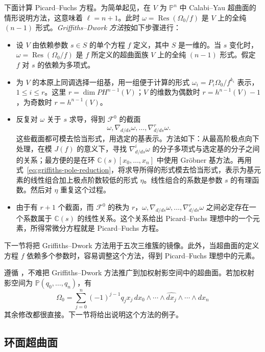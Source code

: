 下面计算 Picard--Fuchs 方程。为简单起见，在 $V$ 为 $\mathbb P^n$ 中 Calabi--Yau 超曲面的情形说明方法，这意味着 $\ell=n+1$。此时 $\omega=\operatorname{Res}(\Omega_0/f)$ 是 $V$ 上的全纯 $(n-1)$ 形式。\emph{Griffiths--Dwork 方法}按如下步骤进行：
\begin{itemize}
\item 设 $V$ 由依赖参数 $s\in S$ 的单个方程 $f$ 定义，其中 $S$ 是一维的。当 $s$ 变化时，$\omega=\operatorname{Res}(\Omega_0/f)$ 是 $f$ 所定义的超曲面族 $V$ 上的全纯 $(n-1)$ 形式。假定 $f$ 对 $s$ 的依赖为多项式。
\item 为 $V$ 的本原上同调选择一组基，用一组便于计算的形式 $\omega_i=P_i\Omega_0/f^{k_i}$ 表示，$1\leq i\leq r$。这里 $r=\dim PH^{n-1}(V)$；$V$ 的维数为偶数时 $r=h^{n-1}(V)-1$，为奇数时 $r=h^{n-1}(V)$。
\item 反复对 $\omega$ 关于 $s$ 求导，得到 $\mathcal F^0$ 的截面
\[
\omega,\nabla_{d/ds}\omega,\ldots,\nabla_{d/ds}^r\omega.
\]
这些截面都可模去恰当形式，用选定的基表示。方法如下：从最高阶极点向下处理，在模 $J(f)$ 的意义下，寻找 $\nabla_{d/ds}^i\omega$ 的分子多项式与选定基的分子之间的关系；最方便的是在环 $\mathbb C(s)[x_0,\ldots,x_n]$ 中使用 Gröbner 基方法。再用式~\eqref{eq:griffiths-pole-reduction}，将求导所得的形式模去恰当形式，表示为基元素的线性组合加上极点阶数较低的形式 $\eta$。线性组合的系数是参数 $s$ 的有理函数。然后对 $\eta$ 重复这个过程。
\item 由于有 $r+1$ 个截面，而 $\mathcal F^0$ 的秩为 $r$，$\omega,\nabla_{d/ds}\omega,\ldots,\nabla_{d/ds}^r\omega$ 之间必定存在一个系数属于 $\mathbb C(s)$ 的线性关系。这个关系给出 Picard--Fuchs 理想中的一个元素，所得常微分方程就是 Picard--Fuchs 方程。
\end{itemize}
下一节将把 Griffiths--Dwork 方法用于五次三维簇的镜像。此外，当超曲面的定义方程 $f$ 依赖多个参数时，容易调整这个方法，得到 Picard--Fuchs 理想中的元素。

遵循 ，不难把 Griffiths--Dwork 方法推广到加权射影空间中的超曲面。若加权射影空间为 $\mathbb P(q_0,\ldots,q_n)$，有
\[
\Omega_0=\sum_{j=0}^n(-1)^{j-1}q_jx_j\,dx_0\wedge\cdots
\wedge\widehat{dx_j}\wedge\cdots\wedge dx_n
\]
其余修改都很直接。下一节将给出说明这个方法的例子。

\subsection{环面超曲面}\label{subsec:toric-residues}

